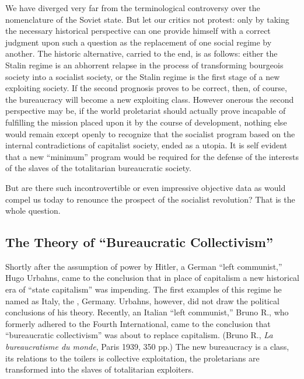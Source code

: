 We have diverged very far from the terminological controversy over the nomenclature of the Soviet state. But let our critics not protest: only by taking the necessary historical perspective can one provide himself with a correct judgment upon such a question as the replacement of one social regime by another. The historic alternative, carried to the end, is as follows: either the Stalin regime is an abhorrent relapse in the process of transforming bourgeois society into a socialist society, or the Stalin regime is the first stage of a new exploiting society. If the second prognosis proves to be correct, then, of course, the bureaucracy will become a new exploiting class. However onerous the second perspective may be, if the world proletariat should actually prove incapable of fulfilling the mission placed upon it by the course of development, nothing else would remain except openly to recognize that the socialist program based on the internal contradictions of capitalist society, ended as a utopia. It is self evident that a new “minimum” program would be required for the defense of the interests of the slaves of the totalitarian bureaucratic society.
\nowidow

But are there such incontrovertible or even impressive objective data as would compel us today to renounce the prospect of the socialist revolution? That is the whole question.

\subsection*{The Theory of “Bureaucratic Collectivism”}

Shortly after the assumption of power by Hitler, a German “left communist,” Hugo Urbahns, came to the conclusion that in place of capitalism a new historical era of “state capitalism” was impending. The first examples of this regime he named as Italy, the \USSR, Germany. Urbahns, however, did not draw the political conclusions of his theory. Recently, an Italian “left communist,” Bruno R., who formerly adhered to the Fourth International, came to the conclusion that “bureaucratic collectivism” was about to replace capitalism. (Bruno R., \emph{La bureaucratisme du monde}, Paris 1939, 350 pp.) The new bureaucracy is a class, its relations to the toilers is collective exploitation, the proletarians are transformed into the slaves of totalitarian exploiters.

